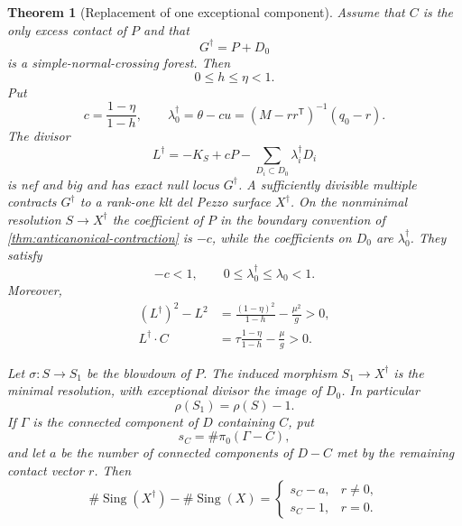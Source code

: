 \documentclass[11pt,reqno]{amsart}
\newtheorem{theorem}{Theorem}[section]
\theoremstyle{definition}
\theoremstyle{remark}
\DeclareMathOperator{\Sing}{Sing}
\numberwithin{equation}{section}
\begin{document}
\begin{theorem}[Replacement of one exceptional component]\label{thm:one-component-replacement}
Assume that $C$ is the only excess contact of $P$ and that
\[
  G^\dagger=P+D_0
\]
is a simple-normal-crossing forest.  Then
\[
  0\le h\le\eta<1.
\]
Put
\begin{equation}\label{eq:replacement-new-data}
  c=\frac{1-\eta}{1-h},
  \qquad
  \lambda_0^\dagger
  =\theta-c u
  =(M-rr^{\mathsf T})^{-1}(q_0-r).
\end{equation}
The divisor
\begin{equation}\label{eq:replacement-anticanonical}
  L^\dagger
  =-K_S+cP-\sum_{D_i\subset D_0}\lambda_i^\dagger D_i
\end{equation}
is nef and big and has exact null locus $G^\dagger$.  A sufficiently divisible multiple contracts $G^\dagger$ to a rank-one klt del Pezzo surface $X^\dagger$.  On the nonminimal resolution $S\to X^\dagger$ the coefficient of $P$ in the boundary convention of \cref{thm:anticanonical-contraction} is $-c$, while the coefficients on $D_0$ are $\lambda_0^\dagger$.  They satisfy
\begin{equation}\label{eq:replacement-coefficient-bounds}
  -c<1,
  \qquad
  0\le\lambda_0^\dagger\le\lambda_0<1.
\end{equation}
Moreover,
\begin{align}
  (L^\dagger)^2-L^2
  &=\frac{(1-\eta)^2}{1-h}-\frac{\mu^2}{g}>0,
  \label{eq:replacement-square-gain}\\
  L^\dagger\cdot C
  &=\tau\frac{1-\eta}{1-h}-\frac{\mu}{g}>0.
  \label{eq:replacement-deleted-degree}
\end{align}

Let $\sigma:S\to S_1$ be the blowdown of $P$.  The induced morphism $S_1\to X^\dagger$ is the minimal resolution,
with exceptional divisor the image of $D_0$. In particular
\[
  \rho(S_1)=\rho(S)-1.
\]
If $\Gamma$ is the connected component of $D$ containing $C$, put
\[
  s_C=\#\pi_0(\Gamma-C),
\]
and let $a$ be the number of connected components of $D-C$ met by the remaining contact vector $r$.  Then
\begin{equation}\label{eq:replacement-component-count}
 \#\Sing(X^\dagger)-\#\Sing(X)
 =
 \begin{cases}
   s_C-a,&r\ne0,\\
   s_C-1,&r=0.
 \end{cases}
\end{equation}
\end{theorem}
\end{document}

